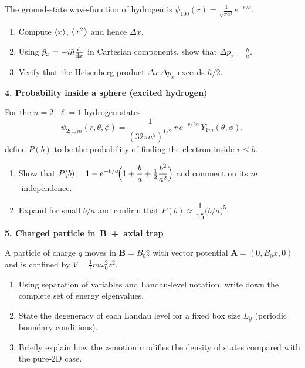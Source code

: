 \documentclass[12pt]{article}
\newcommand{\qs}{\bigskip\bigskip}
\newcommand{\vv}{\medskip}
\begin{document}
The ground‑state wave‑function of hydrogen is
$\displaystyle \psi_{100}(r)=\frac{1}{\sqrt{\pi a^3}}e^{-r/a}$.

\begin{enumerate}[label=\textbf{\alph*)}, leftmargin=1.2cm]
  \item  Compute $\expval{x}$, $\expval{x^2}$ and hence
         $\displaystyle\Delta x$.\vv
  \item  Using 
         $\hat p_x = -i\hbar\dv{}{x}$
         in Cartesian components,
         show that
         $\displaystyle\Delta p_x = \frac{\hbar}{a}$.\vv
  \item  Verify that the Heisenberg product
         $\Delta x\,\Delta p_x$ exceeds $\hbar/2$.
\end{enumerate}

\newpage
{\large\bfseries 4.\; Probability inside a sphere (excited hydrogen)}\qs

For the $n=2$, $\ell=1$ hydrogen states
\[
  \psi_{2;1,m}(r,\theta,\phi)
  = \frac{1}{(32\pi a^5)^{1/2}}\,
    r\,e^{-r/2a}\,Y_{1m}(\theta,\phi),
\]
define $P(b)$ to be the probability of finding the electron inside
$r\le b$.

\begin{enumerate}[label=\textbf{\alph*)}, leftmargin=1.2cm]
  \item  Show that
    $\displaystyle
      P(b)=1-e^{-b/a}\!\Bigl(1+\frac{b}{a}+\tfrac12\frac{b^{2}}{a^{2}}\Bigr)
      $ and comment on its $m$‑independence.\vv
  \item  Expand for small $b/a$ and confirm that
        $P(b)\approx \dfrac{1}{15}\bigl(b/a\bigr)^{5}$.
\end{enumerate}

\newpage
{\large\bfseries 5.\; Charged particle in $\,\mathbf B\!$ + axial trap}\qs

A particle of charge $q$ moves in $\mathbf B=B_0\hat z$ with vector
potential $\mathbf A=(0,B_0x,0)$ and is confined by
$V=\frac12m\omega_0^{2}z^{2}$.

\begin{enumerate}[label=\textbf{\alph*)}, leftmargin=1.2cm]
  \item  Using separation of variables and Landau‑level notation,
         write down the complete set of energy eigenvalues.\vv
  \item  State the degeneracy of each Landau level for a fixed box size
         $L_y$ (periodic boundary conditions).\vv
  \item  Briefly explain how the $z$‑motion modifies the density of
         states compared with the pure‑2D case.
\end{enumerate}
\end{document}
